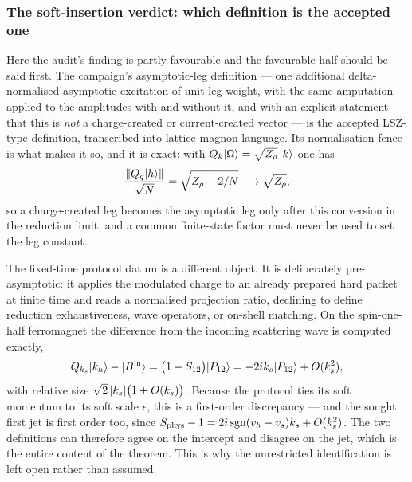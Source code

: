 \subsubsection*{The soft-insertion verdict: which definition is the accepted one}

Here the audit's finding is partly favourable and the favourable half should be
said first. The campaign's asymptotic-leg definition --- one additional
delta-normalised asymptotic excitation of unit leg weight, with the same
amputation applied to the amplitudes with and without it, and with an explicit
statement that this is \emph{not} a charge-created or current-created vector ---
is the accepted LSZ-type definition, transcribed into lattice-magnon language.
Its normalisation fence is what makes it so, and it is exact: with
$Q_k|\Omega\rangle=\sqrt{Z_\rho}\,|k\rangle$ one has
\begin{equation}
  \frac{\lVert Q_q|h\rangle\rVert}{\sqrt N}=\sqrt{Z_\rho-2/N}\longrightarrow\sqrt{Z_\rho},
  \label{eq:da-leg-norm}
\end{equation}
so a charge-created leg becomes the asymptotic leg only after this conversion in
the reduction limit, and a common finite-state factor must never be used to set
the leg constant.

The fixed-time protocol datum is a different object. It is deliberately
pre-asymptotic: it applies the modulated charge to an already prepared hard
packet at finite time and reads a normalised projection ratio, declining to
define reduction exhaustiveness, wave operators, or on-shell matching. On the
spin-one-half ferromagnet the difference from the incoming scattering wave is
computed exactly,
\begin{equation}
  Q_{k_s}|k_h\rangle-|B^{\mathrm{in}}\rangle
  =\bigl(1-S_{12}\bigr)|P_{12}\rangle
  =-2ik_s|P_{12}\rangle+O(k_s^2),
  \label{eq:da-d6-defect}
\end{equation}
with relative size $\sqrt2\,\lvert k_s\rvert\bigl(1+O(k_s)\bigr)$. Because the
protocol ties its soft momentum to its soft scale $\epsilon$, this is a
first-order discrepancy --- and the sought first jet is first order too, since
$S_{\mathrm{phys}}-1=2i\operatorname{sgn}(v_h-v_s)k_s+O(k_s^2)$. The two definitions can
therefore agree on the intercept and disagree on the jet, which is the entire
content of the theorem. This is why the unrestricted identification is left
open rather than assumed.

